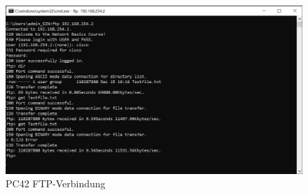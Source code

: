 \documentclass{article}
\begin{document}
\begin{figure}[!htp]
\begin{minipage}[b]{0.25\textwidth}
    \includegraphics[width=\textwidth]{Arbeitsergebnisse/PC42/pc42_ftp.png}
    \caption{PC42 FTP-Verbindung}
  \end{minipage}
\end{figure}
\end{document}
